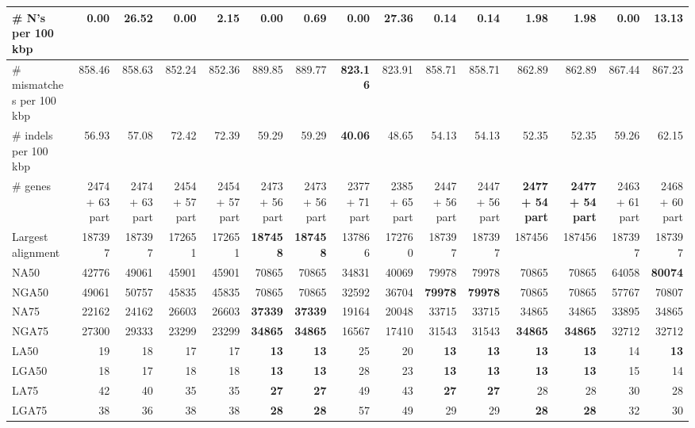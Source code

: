 \documentclass[12pt,a4paper]{article}
\begin{document}
\begin{table}[ht]
\begin{center}
\begin{tabular}{|l*{14}{|r}|}
\# N's per 100 kbp & {\bf 0.00} & 26.52 & {\bf 0.00} & 2.15 & {\bf 0.00} & 0.69 & {\bf 0.00} & 27.36 & 0.14 & 0.14 & 1.98 & 1.98 & {\bf 0.00} & 13.13 \\ \hline
\# mismatches per 100 kbp & 858.46 & 858.63 & 852.24 & 852.36 & 889.85 & 889.77 & {\bf 823.16} & 823.91 & 858.71 & 858.71 & 862.89 & 862.89 & 867.44 & 867.23 \\ \hline
\# indels per 100 kbp & 56.93 & 57.08 & 72.42 & 72.39 & 59.29 & 59.29 & {\bf 40.06} & 48.65 & 54.13 & 54.13 & 52.35 & 52.35 & 59.26 & 62.15 \\ \hline
\# genes & 2474 + 63 part & 2474 + 63 part & 2454 + 57 part & 2454 + 57 part & 2473 + 56 part & 2473 + 56 part & 2377 + 71 part & 2385 + 65 part & 2447 + 56 part & 2447 + 56 part & {\bf 2477 + 54 part} & {\bf 2477 + 54 part} & 2463 + 61 part & 2468 + 60 part \\ \hline
Largest alignment & 187397 & 187397 & 172651 & 172651 & {\bf 187458} & {\bf 187458} & 137866 & 172760 & 187397 & 187397 & 187456 & 187456 & 187397 & 187397 \\ \hline
NA50 & 42776 & 49061 & 45901 & 45901 & 70865 & 70865 & 34831 & 40069 & 79978 & 79978 & 70865 & 70865 & 64058 & {\bf 80074} \\ \hline
NGA50 & 49061 & 50757 & 45835 & 45835 & 70865 & 70865 & 32592 & 36704 & {\bf 79978} & {\bf 79978} & 70865 & 70865 & 57767 & 70807 \\ \hline
NA75 & 22162 & 24162 & 26603 & 26603 & {\bf 37339} & {\bf 37339} & 19164 & 20048 & 33715 & 33715 & 34865 & 34865 & 33895 & 34865 \\ \hline
NGA75 & 27300 & 29333 & 23299 & 23299 & {\bf 34865} & {\bf 34865} & 16567 & 17410 & 31543 & 31543 & {\bf 34865} & {\bf 34865} & 32712 & 32712 \\ \hline
LA50 & 19 & 18 & 17 & 17 & {\bf 13} & {\bf 13} & 25 & 20 & {\bf 13} & {\bf 13} & {\bf 13} & {\bf 13} & 14 & {\bf 13} \\ \hline
LGA50 & 18 & 17 & 18 & 18 & {\bf 13} & {\bf 13} & 28 & 23 & {\bf 13} & {\bf 13} & {\bf 13} & {\bf 13} & 15 & 14 \\ \hline
LA75 & 42 & 40 & 35 & 35 & {\bf 27} & {\bf 27} & 49 & 43 & {\bf 27} & {\bf 27} & 28 & 28 & 30 & 28 \\ \hline
LGA75 & 38 & 36 & 38 & 38 & {\bf 28} & {\bf 28} & 57 & 49 & 29 & 29 & {\bf 28} & {\bf 28} & 32 & 30 \\ \hline
\end{tabular}
\end{center}
\end{table}
\end{document}
